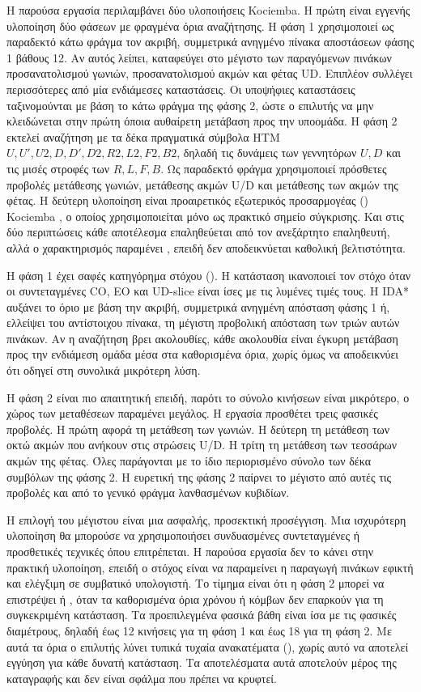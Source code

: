 Η παρούσα εργασία περιλαμβάνει δύο υλοποιήσεις Kociemba. Η πρώτη είναι εγγενής υλοποίηση δύο φάσεων με φραγμένα όρια αναζήτησης. Η φάση 1 χρησιμοποιεί ως παραδεκτό κάτω φράγμα τον ακριβή, συμμετρικά ανηγμένο πίνακα αποστάσεων φάσης 1 βάθους 12. Αν αυτός λείπει, καταφεύγει στο μέγιστο των παραγόμενων πινάκων προσανατολισμού γωνιών, προσανατολισμού ακμών και φέτας UD. Επιπλέον συλλέγει περισσότερες από μία ενδιάμεσες καταστάσεις. Οι υποψήφιες καταστάσεις ταξινομούνται με βάση το κάτω φράγμα της φάσης 2, ώστε ο επιλυτής να μην κλειδώνεται στην πρώτη όποια αυθαίρετη μετάβαση προς την υποομάδα. Η φάση 2 εκτελεί αναζήτηση με τα δέκα πραγματικά σύμβολα HTM \(U,U',U2,D,D',D2,R2,L2,F2,B2\), δηλαδή τις δυνάμεις των γεννητόρων \(U,D\) και τις μισές στροφές των \(R,L,F,B\). Ως παραδεκτό φράγμα χρησιμοποιεί πρόσθετες προβολές μετάθεσης γωνιών, μετάθεσης ακμών U/D και μετάθεσης των ακμών της φέτας. Η δεύτερη υλοποίηση είναι προαιρετικός εξωτερικός προσαρμογέας () Kociemba \cite{muodovKociembaPkg}, ο οποίος χρησιμοποιείται μόνο ως πρακτικό σημείο σύγκρισης. Και στις δύο περιπτώσεις κάθε αποτέλεσμα επαληθεύεται από τον ανεξάρτητο επαληθευτή, αλλά ο χαρακτηρισμός παραμένει , επειδή δεν αποδεικνύεται καθολική βελτιστότητα.

Η φάση 1 έχει σαφές κατηγόρημα στόχου (). Η κατάσταση ικανοποιεί τον στόχο όταν οι συντεταγμένες CO, EO και UD-slice είναι ίσες με τις λυμένες τιμές τους. Η IDA* αυξάνει το όριο με βάση την ακριβή, συμμετρικά ανηγμένη απόσταση φάσης 1 ή, ελλείψει του αντίστοιχου πίνακα, τη μέγιστη προβολική απόσταση των τριών αυτών πινάκων. Αν η αναζήτηση βρει ακολουθίες, κάθε ακολουθία είναι έγκυρη μετάβαση προς την ενδιάμεση ομάδα μέσα στα καθορισμένα όρια, χωρίς όμως να αποδεικνύει ότι οδηγεί στη συνολικά μικρότερη λύση.

Η φάση 2 είναι πιο απαιτητική επειδή, παρότι το σύνολο κινήσεων είναι μικρότερο, ο χώρος των μεταθέσεων παραμένει μεγάλος. Η εργασία προσθέτει τρεις φασικές προβολές. Η πρώτη αφορά τη μετάθεση των γωνιών. Η δεύτερη τη μετάθεση των οκτώ ακμών που ανήκουν στις στρώσεις U/D. Η τρίτη τη μετάθεση των τεσσάρων ακμών της φέτας. Όλες παράγονται με το ίδιο περιορισμένο σύνολο των δέκα συμβόλων της φάσης 2. Η ευρετική της φάσης 2 παίρνει το μέγιστο από αυτές τις προβολές και από το γενικό φράγμα λανθασμένων κυβιδίων.

Η επιλογή του μέγιστου είναι μια ασφαλής, προσεκτική προσέγγιση. Μια ισχυρότερη υλοποίηση θα μπορούσε να χρησιμοποιήσει συνδυασμένες συντεταγμένες ή προσθετικές τεχνικές όπου επιτρέπεται. Η παρούσα εργασία δεν το κάνει στην πρακτική υλοποίηση, επειδή ο στόχος είναι να παραμείνει η παραγωγή πινάκων εφικτή και ελέγξιμη σε συμβατικό υπολογιστή. Το τίμημα είναι ότι η φάση 2 μπορεί να επιστρέψει  ή , όταν τα καθορισμένα όρια χρόνου ή κόμβων δεν επαρκούν για τη συγκεκριμένη κατάσταση. Τα προεπιλεγμένα φασικά βάθη είναι ίσα με τις φασικές διαμέτρους, δηλαδή έως 12 κινήσεις για τη φάση 1 και έως 18 για τη φάση 2. Με αυτά τα όρια ο επιλυτής λύνει τυπικά τυχαία ανακατέματα (), χωρίς αυτό να αποτελεί εγγύηση για κάθε δυνατή κατάσταση. Τα αποτελέσματα αυτά αποτελούν μέρος της καταγραφής και δεν είναι σφάλμα που πρέπει να κρυφτεί.

